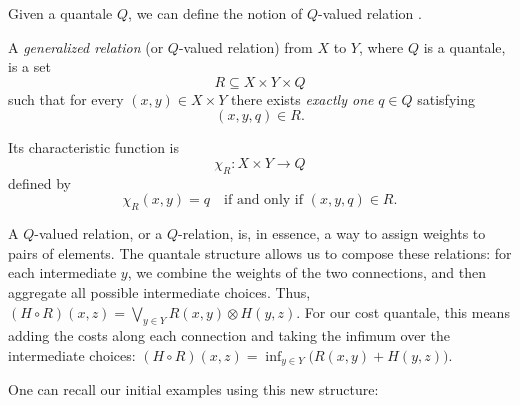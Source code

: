 Given a quantale $Q$, we can define the notion of $Q$-valued relation \cite{coecke2018generalizedrelations}.

\begin{definition}
	A \emph{generalized relation} (or $Q$-valued relation) from $X$ to $Y$, where $Q$ is a quantale, is a set
	\[
		R \subseteq X \times Y \times Q
	\]
	such that for every $(x,y) \in X \times Y$ there exists \emph{exactly one}
	$q \in Q$ satisfying
	\[
		(x,y,q) \in R.
	\]

	Its characteristic function is
	\[
		\chi_R: X \times Y \to Q
	\]
	defined by
	\[
		\chi_R(x,y) = q
		\quad \text{if and only if } (x,y,q) \in R.
	\]
\end{definition}

A $Q$-valued relation, or a $Q$-relation, is, in essence, a way to
assign weights to pairs of elements. The quantale structure allows
us to compose these relations: for each intermediate $y$, we combine
the weights of the two connections, and then aggregate all possible
intermediate choices. Thus, $ (H \circ R)(x,z) = \bigvee_{y \in Y} R(x,y) \otimes H(y,z)$.
For our cost quantale, this means adding the costs along each
connection and taking the infimum over the intermediate choices:
$ (H \circ R)(x,z) = \inf_{y \in Y}\bigl(R(x,y)+H(y,z)\bigr)$.

One can recall our initial examples using this new structure:

